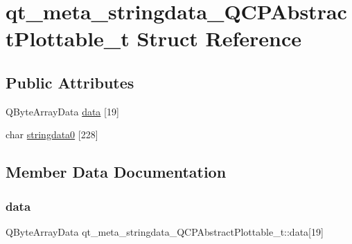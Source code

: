 \hypertarget{structqt__meta__stringdata___q_c_p_abstract_plottable__t}{}\section{qt\+\_\+meta\+\_\+stringdata\+\_\+\+Q\+C\+P\+Abstract\+Plottable\+\_\+t Struct Reference}
\label{structqt__meta__stringdata___q_c_p_abstract_plottable__t}
\subsection*{Public Attributes}
\begin{DoxyCompactItemize}
\item 
Q\+Byte\+Array\+Data \mbox{\hyperlink{structqt__meta__stringdata___q_c_p_abstract_plottable__t_a19f049cb951f7e2476afecb5acaa66f4}{data}} \mbox{[}19\mbox{]}
\item 
char \mbox{\hyperlink{structqt__meta__stringdata___q_c_p_abstract_plottable__t_af8d310f1ebed17d88879a24e267d1289}{stringdata0}} \mbox{[}228\mbox{]}
\end{DoxyCompactItemize}


\subsection{Member Data Documentation}
\mbox{\label{structqt__meta__stringdata___q_c_p_abstract_plottable__t_a19f049cb951f7e2476afecb5acaa66f4}} 
\subsubsection{\texorpdfstring{data}{data}}
{\footnotesize\ttfamily Q\+Byte\+Array\+Data qt\+\_\+meta\+\_\+stringdata\+\_\+\+Q\+C\+P\+Abstract\+Plottable\+\_\+t\+::data\mbox{[}19\mbox{]}}

\mbox{\label{structqt__meta__stringdata___q_c_p_abstract_plottable__t_af8d310f1ebed17d88879a24e267d1289}} 
